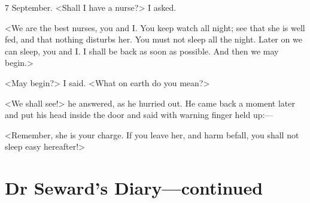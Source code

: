 \begin{diary}{7 September.}
<Shall I have a nurse?> I asked.

<We are the best nurses, you and I\@. You keep watch all night; see that she is well fed, and that nothing disturbs her. You must not sleep all the night. Later on we can sleep, you and I\@. I shall be back as soon as possible. And then we may begin.>

<May begin?> I said. <What on earth do you mean?>

<We shall see!> he answered, as he hurried out. He came back a moment later and put his head inside the door and said with warning finger held up:—

<Remember, she is your charge. If you leave her, and harm befall, you shall not sleep easy hereafter!>

\end{diary}

\section{Dr Seward's Diary—continued}

